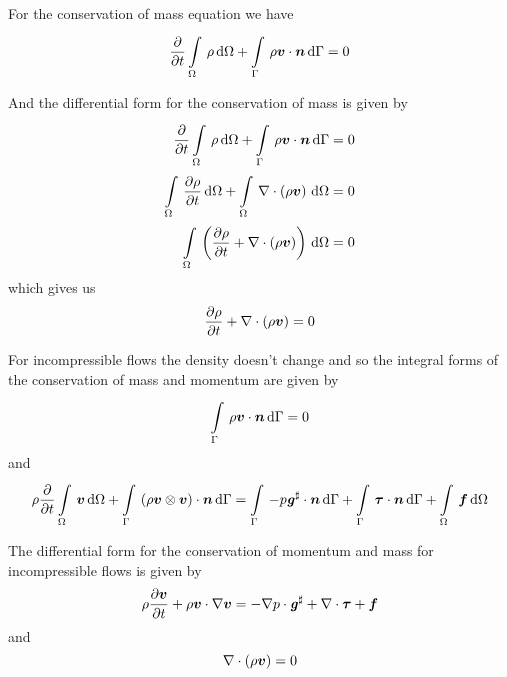 For the conservation of mass equation we have
\begin{equation}
  \delby{}{t}\gint{\Omega}{}{\rho}{\Omega}+\gint{\Gamma}{}{\dotprod{\rho\vectr{v}}{\vectr{n}}}{\Gamma}=0
  \label{eqn:integralconservationofmass}
\end{equation}

And the differential form for the conservation of mass is given by
\begin{equation}
  \begin{split}
    \delby{}{t}\gint{\Omega}{}{\rho}{\Omega}+\gint{\Gamma}{}{\dotprod{\rho\vectr{v}}{\vectr{n}}}{\Gamma}&=0
    \\
    \gint{\Omega}{}{\delby{\rho}{t}}{\Omega}+\gint{\Omega}{}{\divergence{}{\pbrac{\rho\vectr{v}}}}{\Omega}&=0\\
    \gint{\Omega}{}{\pbrac{\delby{\rho}{t}+\divergence{}{\pbrac{\rho\vectr{v}}}}}{\Omega}&=0
  \end{split}
\end{equation}
which gives us
\begin{equation}
  \delby{\rho}{t}+\divergence{}{\pbrac{\rho\vectr{v}}}=0
  \label{eqn:differentialconservationofmass}
\end{equation}

For incompressible flows the density doesn't change and so the integral forms
of the conservation of mass and momentum are given by
\begin{equation}
  \gint{\Gamma}{}{\dotprod{\rho\vectr{v}}{\vectr{n}}}{\Gamma}=0
\end{equation}
and
\begin{equation}
  \rho\delby{}{t}\gint{\Omega}{}{\vectr{v}}{\Omega}
  +\gint{\Gamma}{}{\dotprod{\pbrac{\tensorprod{\rho\vectr{v}}{\vectr{v}}}}{\vectr{n}}}{\Gamma}
  =\gint{\Gamma}{}{\dotprod{-p\sharptensor{\tensor{g}}}{\vectr{n}}}{\Gamma}
  +\gint{\Gamma}{}{\dotprod{\tensor{\tau}}{\vectr{n}}}{\Gamma}
  +\gint{\Omega}{}{\vectr{f}}{\Omega}
\end{equation}

The differential form for the conservation of momentum and mass for
incompressible flows is given by
\begin{equation}
  \rho\delby{\vectr{v}}{t}+\dotprod{\rho\vectr{v}}{\gradient{}{\vectr{v}}}
  =-\dotprod{\gradient{}{p}}{\sharptensor{\tensor{g}}}+\divergence{}{\tensor{\tau}}+\vectr{f}
  \label{eqn:DiffIncompNSEMomentum}
\end{equation}
and
\begin{equation}
  \divergence{}{\pbrac{\rho\vectr{v}}}=0
  \label{eqn:DiffIncompNSEMass}
\end{equation}

